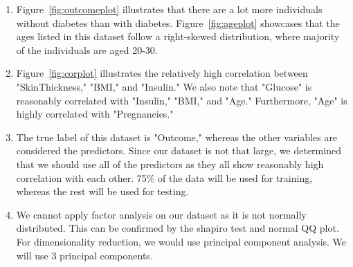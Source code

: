 \documentclass[12pt]{article}
\begin{document}
\begin{enumerate} 
	
	\item Figure~\ref{fig:outcomeplot} illustrates that there are a lot more individuals without diabetes than with diabetes. Figure~\ref{fig:ageplot} showcases that the ages listed in this dataset follow a right-skewed distribution, where majority of the individuals are aged 20-30. 
	
	\item Figure~\ref{fig:corplot} illustrates the relatively high correlation between "SkinThickness," "BMI," and "Insulin." We also note that "Glucose" is reasonably correlated with "Insulin," "BMI," and "Age." Furthermore, "Age" is highly correlated with "Pregnancies." 
	
	\item The true label of this dataset is "Outcome," whereas the other variables are considered the predictors. Since our dataset is not that large, we determined that we should use all of the predictors as they all show reasonably high correlation with each other. 75\% of the data will be used for training, whereas the rest will be used for testing. 
	
	\item We cannot apply factor analysis on our dataset as it is not normally distributed. This can be confirmed by the shapiro test and normal QQ plot. For dimensionality reduction, we would use principal component analysis. We will use 3 principal components.\\  
	

\end{enumerate}
\end{document}
